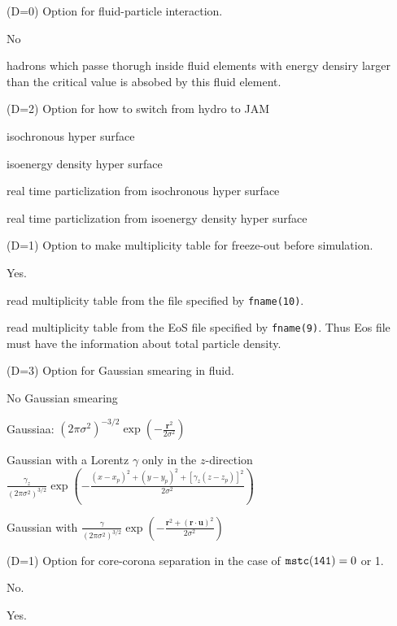 \documentclass[]{article}
\newenvironment{entry}%
{\begin{list}{}{\setlength{\topsep}{0mm} \setlength{\itemsep}{0mm}
\setlength{\parskip}{0mm} \setlength{\parsep}{0mm}
\setlength{\leftmargin}{20mm} \setlength{\rightmargin}{0mm}
\setlength{\labelwidth}{18mm} \setlength{\labelsep}{2mm}}}%
{\end{list}}
\newenvironment{subentry}%
{\begin{list}{}{\setlength{\topsep}{0mm} \setlength{\itemsep}{0mm}
\setlength{\parskip}{0mm} \setlength{\parsep}{0mm}
\setlength{\leftmargin}{10mm} \setlength{\rightmargin}{0mm}
\setlength{\labelwidth}{18mm} \setlength{\labelsep}{2mm}}}%
{\end{list}}
\newcommand{\ttt}[1]{{\tt#1}}
\newcommand{\itemt}[1]{\item[{\tt #1}\hfill]}
\begin{document}
\begin{entry}
\itemt{mstc(143) :}(D=0) Option for fluid-particle interaction.
 \begin{subentry}
    \itemt{$=0$ :} No
    \itemt{$=1$ :} hadrons which passe thorugh inside fluid elements
    with energy densiry larger than the critical value is absobed 
    by this fluid element.
\end{subentry}

\itemt{mstc(144) :}(D=2) Option for how to switch from hydro to JAM
 \begin{subentry}
    \itemt{$=1$ :} isochronous hyper surface
    \itemt{$=2$ :} isoenergy density hyper surface
    \itemt{$=11$ :} real time particlization from isochronous hyper surface
    \itemt{$=12$ :} real time particlization from isoenergy density hyper surface
 \end{subentry}

\itemt{mstc(145) :}(D=1) Option to make multiplicity table
 for freeze-out before simulation.
 \begin{subentry}
    \itemt{$=0$ :} Yes.
    \itemt{$=1$ :} read multiplicity table from the file specified by
    \ttt{fname(10)}.
    \itemt{$=2$ :} read multiplicity table from the EoS file specified by
    \ttt{fname(9)}. Thus Eos file must have the information about total particle
    density.
 \end{subentry}


\itemt{mstc(146) :}(D=3) Option for Gaussian smearing in fluid.
 \begin{subentry}
    \itemt{$=0$ :} No Gaussian smearing
    \itemt{$=1$ :} Gaussiaa:
    $(2\pi\sigma^2)^{-3/2}
         \exp\left(-\frac{\bm{r}^2}{2\sigma^2}\right)$
    \itemt{$=2$ :} Gaussian with a Lorentz $\gamma$ only in the $z$-direction
    $\frac{\gamma_z}{(2\pi\sigma^2)^{3/2}}
    \exp\left(-\frac{(x-x_p)^2+(y-y_p)^2+[\gamma_z(z-z_p)]^2}{2\sigma^2}\right)$
    \itemt{$=3$ :} Gaussian with $\frac{\gamma}{(2\pi\sigma^2)^{3/2}}
         \exp\left(-\frac{\bm{r}^2+(\bm{r}\cdot\bm{u})^2}{2\sigma^2}\right)$
 \end{subentry}

\itemt{mstc(147) :}(D=1) Option for core-corona separation 
in the case of ${\tt mstc(141)}=0$ or 1.
 \begin{subentry}
    \itemt{$=0$ :} No.
    \itemt{$=1$ :} Yes.
 \end{subentry}


\end{entry}
\end{document}
